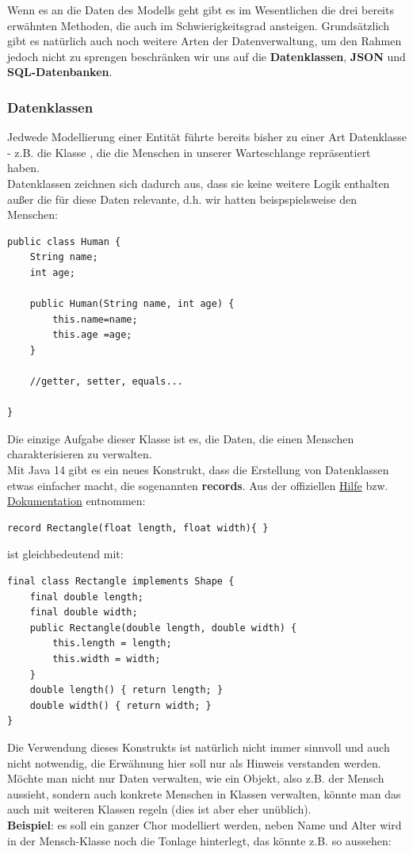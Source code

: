 \documentclass{article}
\begin{document}
Wenn es an die Daten des Modells geht gibt es im Wesentlichen die drei bereits erwähnten Methoden, die auch im Schwierigkeitsgrad ansteigen. Grundsätzlich gibt es natürlich auch noch weitere Arten der Datenverwaltung, um den Rahmen jedoch nicht zu sprengen beschränken wir uns auf die \textbf{Datenklassen}, \textbf{JSON} und \textbf{SQL-Datenbanken}.
\vspace{-3mm}
\subsubsection{Datenklassen}

Jedwede Modellierung einer  Entität führte bereits bisher zu einer Art Datenklasse - z.B. die Klasse , die die Menschen in unserer Warteschlange repräsentiert haben. \\
Datenklassen zeichnen sich dadurch aus, dass sie keine weitere Logik enthalten außer die für diese Daten relevante, d.h. wir hatten beispspielsweise den Menschen:
\begin{verbatim}
public class Human {
    String name;
    int age;

    public Human(String name, int age) {
        this.name=name;
        this.age =age;
    }

    //getter, setter, equals...

}
\end{verbatim}
Die einzige Aufgabe dieser Klasse ist es, die Daten, die einen Menschen charakterisieren zu verwalten. \\ 
Mit Java 14 gibt es ein neues Konstrukt, dass die Erstellung von Datenklassen etwas einfacher macht, die sogenannten \textbf{records}. Aus der offiziellen \href{https://docs.oracle.com/en/java/javase/14/language/records.html}{Hilfe} bzw. \href{https://docs.oracle.com/en/java/javase/17/docs/api/java.base/java/lang/Record.html}{Dokumentation} entnommen:
\begin{verbatim}
record Rectangle(float length, float width){ }
\end{verbatim}
ist gleichbedeutend mit:
\begin{verbatim}
final class Rectangle implements Shape {
    final double length;
    final double width;
    public Rectangle(double length, double width) {
        this.length = length;
        this.width = width;
    }
    double length() { return length; }
    double width() { return width; }
}
\end{verbatim}
Die Verwendung dieses Konstrukts ist natürlich nicht immer sinnvoll und auch nicht notwendig, die Erwähnung hier soll nur als Hinweis verstanden werden. \\
Möchte man nicht nur Daten verwalten, wie ein Objekt, also z.B. der Mensch aussieht, sondern auch konkrete Menschen in Klassen verwalten, könnte man das auch mit weiteren Klassen regeln (dies ist aber eher unüblich). \\
\textbf{Beispiel}: es soll ein ganzer Chor modelliert werden, neben Name und Alter wird in der Mensch-Klasse noch die Tonlage hinterlegt, das könnte z.B. so aussehen: 
\end{document}
